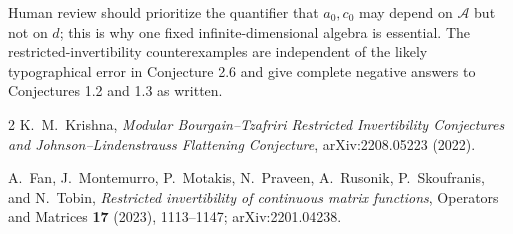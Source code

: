 \documentclass[11pt]{article}
\newcommand{\A}{\mathcal A}
\begin{document}
Human review should prioritize the quantifier that $a_0,c_0$ may depend on
$\A$ but not on $d$; this is why one fixed infinite-dimensional algebra is
essential.  The restricted-invertibility counterexamples are independent
of the likely typographical error in Conjecture 2.6 and give complete
negative answers to Conjectures 1.2 and 1.3 as written.

\begin{thebibliography}{2}
K.~M.~Krishna,
\newblock \emph{Modular Bourgain--Tzafriri Restricted Invertibility
Conjectures and Johnson--Lindenstrauss Flattening Conjecture},
\newblock arXiv:2208.05223 (2022).

A.~Fan, J.~Montemurro, P.~Motakis, N.~Praveen, A.~Rusonik,
P.~Skoufranis, and N.~Tobin,
\newblock \emph{Restricted invertibility of continuous matrix functions},
\newblock Operators and Matrices \textbf{17} (2023), 1113--1147;
arXiv:2201.04238.
\end{thebibliography}
\end{document}
